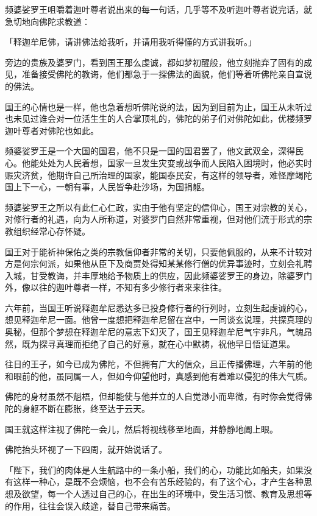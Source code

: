 \documentclass[12pt,twoside,openany]{book}
\begin{document}
频婆娑罗王咀嚼着迦叶尊者说出来的每一句话，几乎等不及听迦叶尊者说完话，就急切地向佛陀求教道：

「释迦牟尼佛，请讲佛法给我听，并请用我听得懂的方式讲我听。」

旁边的贵族及婆罗门，看到国王那么虔诚，都如梦初醒般，他立刻抛弃了固有的成见，准备接受佛陀的教诲，他们都急于一探佛法的面貌，他们等着听佛陀亲自宣说的佛法。

国王的心情也是一样，他也急着想听佛陀说的法，因为到目前为止，国王从未听过也未见过谁会对一位活生生的人合掌顶礼的，佛陀的弟子们对佛陀如此，优楼频罗迦叶尊者对佛陀也如此。

频婆娑罗王是一个大国的国君，他不只是一国的国君罢了，他文武双全，深得民心。他能处处为人民着想，国家一旦发生灾变或战争而人民陷入困境时，他必实时赈灾济贫，他期许自己所治理的国家，能国泰民安，有这样的领导者，难怪摩竭陀国上下一心，一朝有事，人民皆争赴沙场，为国捐躯。

频婆娑罗王之所以有此仁心仁政，实由于他有坚定的信仰心，国王对宗教的关心，对修行者的礼遇，向为人所称道，对婆罗门自然非常重视，但对他们流于形式的宗教组织经常心存怀疑。

国王对于能祈神保佑之类的宗教信仰者非常的关切，只要他佩服的，从来不计较对方是何宗何派，如果他从臣下及商贾处得知某某修行僧的优异事迹时，立刻会礼聘入城，甘受教诲，并丰厚地给予物质上的供应，因此频婆娑罗王的身边，除婆罗门外，像以往的迦叶尊者一样，不知有多少修行者来来往往。

六年前，当国王听说释迦牟尼悉达多已投身修行者的行列时，立刻生起虔诚的心，想见释迦牟尼一面。他曾一度想把释迦牟尼留在宫中，一同谈玄说理，共探真理的奥秘，但那个梦想在释迦牟尼的意志下幻灭了，国王见释迦牟尼气宇非凡，气魄昂然，既为探寻真理而拒绝了自己的好意，就在心中默祷，祝他早日悟证道果。

往日的王子，如今已成为佛陀，不但拥有广大的信众，且正传播佛理，六年前的他和眼前的他，虽同属一人，但如今仰望他时，真感到他有着难以侵犯的伟大气质。

佛陀的身材虽然不魁梧，但却能使与他并立的人自觉渺小而卑微，有时你会觉得佛陀的身躯不断在膨胀，终至达于云天。

国王就这样注视了佛陀一会儿，然后将视线移至地面，并静静地阖上眼。

佛陀抬头环视了一下四周，就开始说话了。

「陛下，我们的肉体是人生航路中的一条小船，我们的心，功能比如船夫，如果没有这样一种心，是既不会烦恼，也不会有苦乐经验的，有了这个心，才产生各种思想及欲望，每一个人透过自己的心，在出生的环境中，受生活习惯、教育及思想等的作用，往往会误入歧途，替自己带来痛苦。
\end{document}
